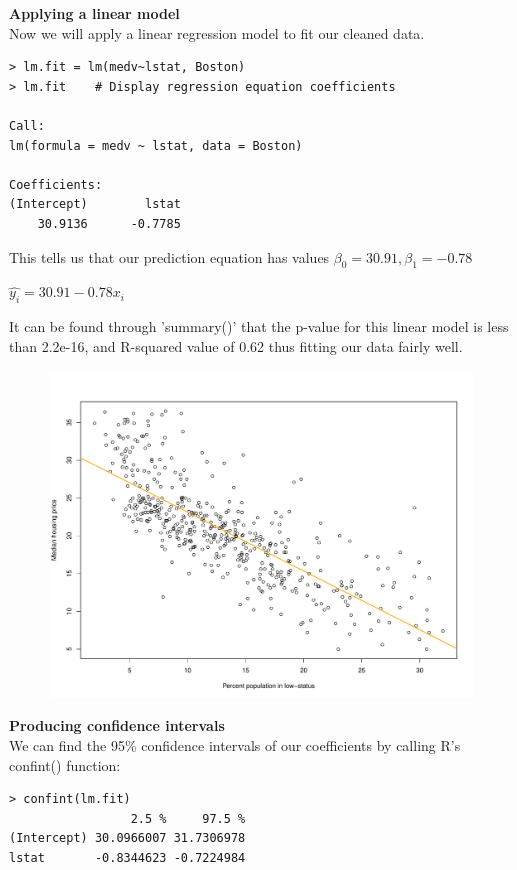 \documentclass{article}
\begin{document}
{\large \bf Applying a linear model}\\
Now we will apply a linear regression model to fit our cleaned data. 

\begin{verbatim}
> lm.fit = lm(medv~lstat, Boston)
> lm.fit    # Display regression equation coefficients

Call:
lm(formula = medv ~ lstat, data = Boston)

Coefficients:
(Intercept)        lstat  
    30.9136      -0.7785  
\end{verbatim}

This tells us that our prediction equation has values 
$\beta_0 = 30.91, \beta_1 = -0.78$

\begin{center}
  $\hat{y_i} = 30.91 - 0.78x_i$
\end{center}

It can be found through 'summary()' that the p-value for this linear model is
less than 2.2e-16, and R-squared value of 0.62 thus fitting our data fairly well.
\pagebreak

\begin{figure}[!ht]
  \centering
  \includegraphics[width=0.65\linewidth]{medv-vs-lstat-simple-regression.pdf}
\end{figure}


{\large \bf Producing confidence intervals} \\
We can find the 95\% confidence intervals of our coefficients by calling R's 
confint() function:

\begin{verbatim}
> confint(lm.fit)
                 2.5 %     97.5 %
(Intercept) 30.0966007 31.7306978
lstat       -0.8344623 -0.7224984
\end{verbatim}
\end{document}
